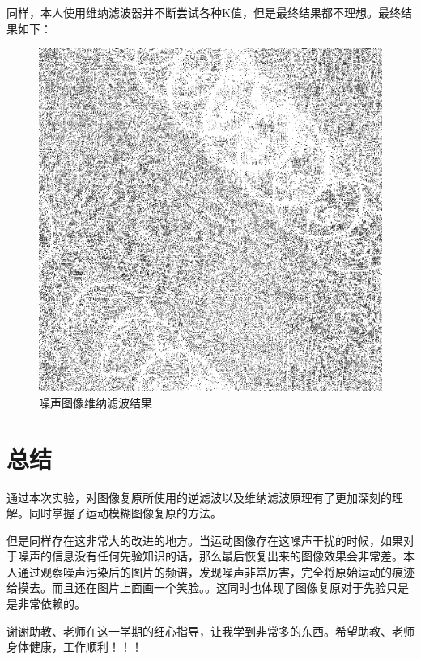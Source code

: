\documentclass{article}
\begin{document}
	同样，本人使用维纳滤波器并不断尝试各种K值，但是最终结果都不理想。最终结果如下：
	\begin{figure}[H]
		\centering
		\includegraphics[scale = 0.5]{noise_result2.png}
		\caption{噪声图像维纳滤波结果}
	\end{figure}
	\section{总结}
	通过本次实验，对图像复原所使用的逆滤波以及维纳滤波原理有了更加深刻的理解。同时掌握了运动模糊图像复原的方法。
	
	但是同样存在这非常大的改进的地方。当运动图像存在这噪声干扰的时候，如果对于噪声的信息没有任何先验知识的话，那么最后恢复出来的图像效果会非常差。本人通过观察噪声污染后的图片的频谱，发现噪声非常厉害，完全将原始运动的痕迹给摸去。而且还在图片上面画一个笑脸。。这同时也体现了图像复原对于先验只是是非常依赖的。
	
	谢谢助教、老师在这一学期的细心指导，让我学到非常多的东西。希望助教、老师身体健康，工作顺利！！！
\end{document}
